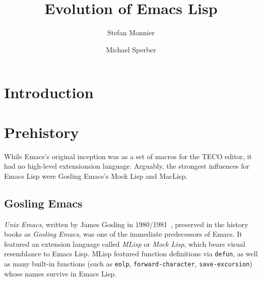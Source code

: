 \documentclass[format=acmsmall, review=false, screen=true]{acmart}
\begin{document}
\title{Evolution of Emacs Lisp}

\author{Stefan Monnier}
\author{Michael Sperber}





%
%




\maketitle

\section{Introduction}

\section{Prehistory}


While Emacs's original inception was as a set of macros for the TECO
editor, it had no high-level extensionsion language.  Arguably, the
strongest influences for Emacs Lisp were Gosling Emacs's Mock Lisp and
MacLisp.

\subsection{Gosling Emacs}

\textit{Unix Emacs}, written by James Gosling in
1980/1981~\cite{Gosling1981}, preserved in the history books
as \textit{Gosling Emacs}, was one of the immediate predecessors of
Emacs.  It featured an extension language called \textit{MLisp} or
\textit{Mock Lisp}, which bears visual resemblance to Emacs Lisp.
MLisp featured function definitions via \texttt{defun}, as well as
many built-in functions (such as \texttt{eolp},
\texttt{forward-character}, \texttt{save-excursion}) whose names
survive in Emacs Lisp.
\end{document}

